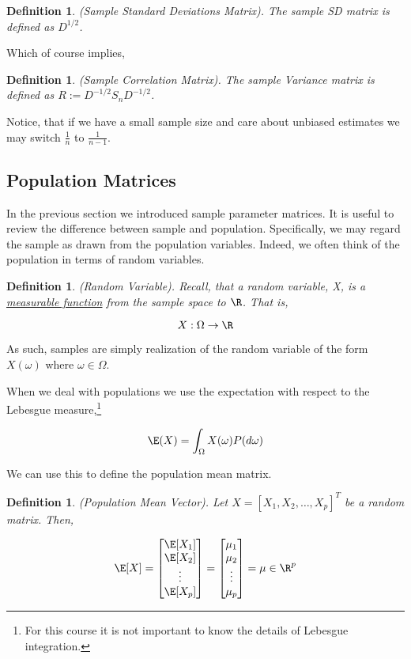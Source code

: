 \documentclass[twoside]{article}
\newtheorem{definition}[theorem]{Definition}
\begin{document}
\begin{definition}(Sample Standard Deviations Matrix). 
The sample SD matrix is defined as $D^{1/2}$.
\end{definition}

Which of course implies,

\begin{definition}(Sample Correlation Matrix). 
The sample Variance matrix is defined as $R := D^{-1/2}S_nD^{-1/2}$.
\end{definition}

Notice, that if we have a small sample size and care about unbiased estimates we may switch $\frac{1}{n}$ to $\frac{1}{n-1}$.

\subsection{Population Matrices}

In the previous section we introduced sample parameter matrices. It is useful to review the difference between sample and population. Specifically, we may regard the sample as drawn from the population variables. Indeed, we often think of the population in terms of random variables. 

\begin{definition}(Random Variable).
Recall, that a random variable, X, is a \underline{measurable function} from the sample space to $\R$. That is,

$$X: \Omega \rightarrow \R$$
\end{definition}

As such, samples are simply realization of the random variable of the form $X(\omega)$ where $\omega\in\Omega$.

When we deal with populations we use the expectation with respect to the Lebesgue measure,\footnote{For this course it is not important to know the details of Lebesgue integration.}

$$\E(X) = \int_\Omega X(\omega)P(d\omega)$$

We can use this to define the population mean matrix.

\begin{definition}(Population Mean Vector).
Let $X = [X_1,X_2,\dots,X_p]^T$ be a random matrix. Then,

$$\E[X] = \begin{bmatrix}\E[X_1]\\\E[X_2]\\\vdots\\\E[X_p]\end{bmatrix} = \begin{bmatrix}\mu_1\\\mu_2\\\vdots\\\mu_p\end{bmatrix}=\mu \in\R^p $$

\end{definition}
\end{document}
